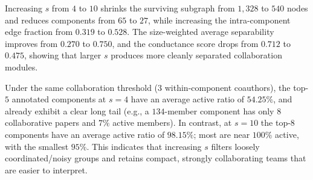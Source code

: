 Increasing $s$ from $4$ to $10$ shrinks the surviving subgraph from $1{,}328$ to $540$ nodes and reduces components from $65$ to $27$,
while increasing the intra-component edge fraction from $0.319$ to $0.528$.
The size-weighted average separability improves from $0.270$ to $0.750$, and the conductance score drops from $0.712$ to $0.475$,
showing that larger $s$ produces more cleanly separated collaboration modules.

Under the same collaboration threshold (3 within-component coauthors), the top-$5$ annotated components at $s{=}4$
have an average active ratio of $54.25\%$, and already exhibit a clear long tail (e.g., a $134$-member component has only $8$ collaborative papers and $7\%$ active members).
In contrast, at $s{=}10$ the top-$8$ components have an average active ratio of $98.15\%$; most are near $100\%$ active, with the smallest $95\%$.
This indicates that increasing $s$ filters loosely coordinated/noisy groups and retains compact, strongly collaborating teams that are easier to interpret.



